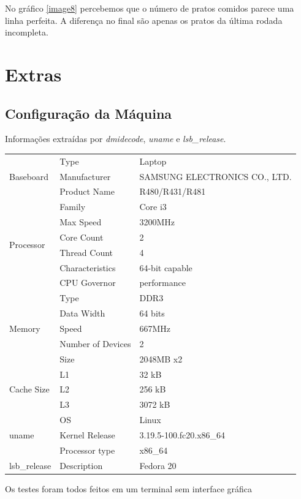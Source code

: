 \documentclass[paper=a4, fontsize=11pt]{scrartcl}
\numberwithin{equation}{section}		%
\numberwithin{figure}{section}			%
\numberwithin{table}{section}				%
\begin{document}
No gráfico \ref{image8} percebemos que o número de pratos comidos parece uma linha perfeita. A diferença no final são apenas os pratos da última rodada incompleta.

\pagebreak
\section{Extras}
\subsection{Configuração da Máquina}
	Informações extraídas por \textit{dmidecode}, \textit{uname} e \textit{lsb\_release}.\\

	\begin{tabular}{lll}
		\multirow{3}{*}{Baseboard} & Type& Laptop\\
		& Manufacturer& SAMSUNG ELECTRONICS CO., LTD.\\
		& Product Name& R480/R431/R481\\
		\hline
		\multirow{6}{*}{Processor}& Family& Core i3\\
		& Max Speed& 3200MHz\\
		& Core Count& 2\\
		& Thread Count& 4\\
		& Characteristics& 64-bit capable\\
		& CPU Governor& performance\\
		\hline
		\multirow{5}{*}{Memory}& Type& DDR3\\
		& Data Width& 64 bits\\
		& Speed& 667MHz\\
		& Number of Devices& 2\\
		& Size& 2048MB x2\\
		\hline
		\multirow{3}{*}{Cache Size}& L1& 32 kB\\
		& L2& 256 kB\\
		& L3& 3072 kB\\
		\hline
		\multirow{3}{*}{uname}& OS& Linux\\
		& Kernel Release& 3.19.5-100.fc20.x86\_64\\
		& Processor type& x86\_64\\
		\hline
		\multirow{1}{*}{lsb\_release}& Description& Fedora 20\\
	\end{tabular}

Os testes foram todos feitos em um terminal sem interface gráfica
\end{document}
